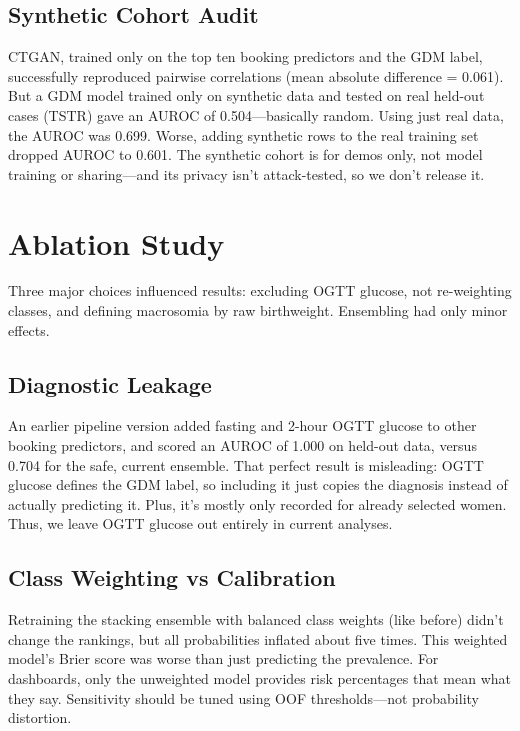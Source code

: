 \documentclass[conference]{IEEEtran}
\begin{document}
\subsection{Synthetic Cohort Audit}

CTGAN, trained only on the top ten booking predictors and the GDM label, successfully reproduced pairwise correlations (mean absolute difference = 0.061). But a GDM model trained only on synthetic data and tested on real held-out cases (TSTR) gave an AUROC of 0.504---basically random. Using just real data, the AUROC was 0.699. Worse, adding synthetic rows to the real training set dropped AUROC to 0.601. The synthetic cohort is for demos only, not model training or sharing---and its privacy isn't attack-tested, so we don't release it.



\section{Ablation Study}

Three major choices influenced results: excluding OGTT glucose, not re-weighting classes, and defining macrosomia by raw birthweight. Ensembling had only minor effects.



\subsection{Diagnostic Leakage}

An earlier pipeline version added fasting and 2-hour OGTT glucose to other booking predictors, and scored an AUROC of 1.000 on held-out data, versus 0.704 for the safe, current ensemble. That perfect result is misleading: OGTT glucose defines the GDM label, so including it just copies the diagnosis instead of actually predicting it. Plus, it's mostly only recorded for already selected women. Thus, we leave OGTT glucose out entirely in current analyses.



\subsection{Class Weighting vs Calibration}

Retraining the stacking ensemble with balanced class weights (like before) didn't change the rankings, but all probabilities inflated about five times. This weighted model's Brier score was worse than just predicting the prevalence. For dashboards, only the unweighted model provides risk percentages that mean what they say. Sensitivity should be tuned using OOF thresholds---not probability distortion.
\end{document}
